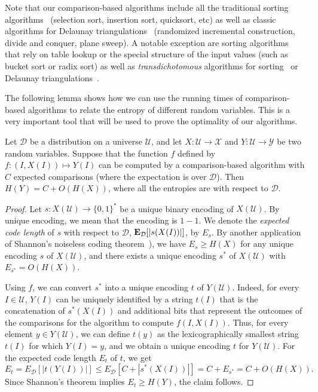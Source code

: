 \documentclass{siamltex}
\newcommand{\D}{\mathcal{D}}
\newcommand{\cU}{\mathcal{U}}
\newcommand{\cX}{\mathcal{X}}
\newcommand{\cY}{\mathcal{Y}}
\newcommand{\EX}{\hbox{\bf E}}
\begin{document}
Note that our comparison-based algorithms include all the 
traditional sorting algorithms~\cite{CormenLeRiSt09} (selection sort, 
insertion sort, quicksort, etc) as well as classic algorithms
for Delaunay triangulations~\cite{deBergKrOvSc00}
(randomized incremental construction, divide and conquer, plane sweep).
A notable exception are sorting algorithms that rely on table lookup
or the special structure of the input values (such as bucket sort or radix 
sort) as well as \emph{transdichotomous} algorithms for 
sorting~\cite{Han04,HanTh02} or Delaunay 
triangulations~\cite{BuchinMu09,ChanPa07,ChanPa09}.

The following lemma
shows how we can use the running times of comparison-based algorithms
to relate the entropy of different random variables. 
This is a very important tool that will be used to 
prove the optimality of our algorithms.
\medskip
\begin{lemma}\label{lem:relate-entropy}
Let $\D$ be a distribution on a universe $\cU$, and let
$X: \cU \rightarrow \cX$ and 
$Y: \cU \rightarrow \cY$
be two random variables. Suppose that the function 
$f$ defined by $f : (I, X(I)) \mapsto Y(I)$
can be computed by a comparison-based algorithm
with $C$ expected comparisons (where the expectation is over $\D$). 
Then $H(Y) = C + O(H(X))$, where all the entropies 
are with respect to $\D$.
\end{lemma}

\begin{proof}
Let $s : X(\cU) \rightarrow \{0,1\}^*$ be a unique binary encoding of 
$X(\cU)$. By unique encoding, we mean that the encoding is $1-1$. We denote the \emph{expected code length} of $s$ with
respect to $\D$, $\EX_\D[|s(X(I))|] $, by $E_s$.
By another application of Shannon's noiseless coding 
theorem~\cite[Theorem 5.4.1]{CoverTh06}), 
we have $E_s \geq H(X)$ for any unique encoding $s$ of $X(\cU)$, and there 
exists a unique encoding $s^*$ of $X(\cU)$ with $E_{s^*} = O(H(X))$. 

Using $f$, 
we can  convert $s^*$ into a unique encoding $t$ of $Y(\cU)$. Indeed, 
for every $I \in \cU$, $Y(I)$ can be uniquely identified by a string
$t(I)$ that is the concatenation of
$s^*(X(I))$ and additional bits that represent the 
outcomes of the comparisons for the algorithm to compute $f(I, X(I))$. 
Thus, for every element $y \in Y(\cU)$, we can define $t(y)$
as the lexicographically smallest string $t(I)$ for which $Y(I) = y$, and
we obtain a unique encoding $t$ for $Y(\cU)$. For the  expected code length
$E_t$ of $t$, we get
\[
E_t = E_\D[|t(Y(I))|] \leq 
E_\D[C + |s^*(X(I))| ] = C + E_{s^*} = C + O(H(X)). 
\]
Since Shannon's theorem implies $E_t \geq H(Y)$, 
the claim follows.
\end{proof}
\end{document}
